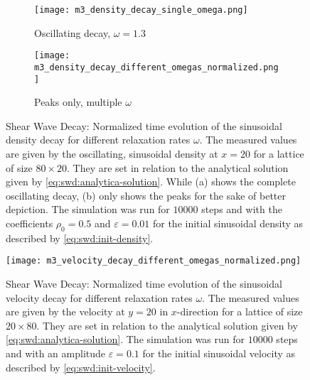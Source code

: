 \begin{figure}[ht!]
    \begin{subfigure}{\linewidth}
        \centering
        \texttt{[image: m3\_density\_decay\_single\_omega.png]}
        \caption{Oscillating decay, $\omega=1.3$}
        \label{fig:swd:density:single-omega}
    \end{subfigure}

    \begin{subfigure}{\linewidth}
        \texttt{[image: m3\_density\_decay\_different\_omegas\_normalized.png]}
        \caption{Peaks only, multiple $\omega$}
        \label{fig:swd:density:multiple-omega}
    \end{subfigure}

    \caption[Shear Wave Decay: Normalized time evolution of the sinusoidal density decay for different relaxation rates $\omega$]{Shear Wave Decay: Normalized time evolution of the sinusoidal density decay for different relaxation rates $\omega$. The measured values are given by the oscillating, sinusoidal density at $x=20$ for a lattice of size $80\times20$. They are set in relation to the analytical solution given by \cref{eq:swd:analytica-solution}. While (a) shows the complete oscillating decay, (b) only shows the peaks for the sake of better depiction. The simulation was run for $10000$ steps and with the coefficients $\rho_0=0.5$ and $\varepsilon=0.01$ for the initial sinusoidal density as described by \cref{eq:swd:init-density}.}
    \label{fig:swd:density:decay}
\end{figure}

\begin{figure}[ht!]
    \texttt{[image: m3\_velocity\_decay\_different\_omegas\_normalized.png]}
    \caption[Shear Wave Decay: Normalized time evolution of the sinusoidal velocity decay for different relaxation rates $\omega$]{Shear Wave Decay: Normalized time evolution of the sinusoidal velocity decay for different relaxation rates $\omega$. The measured values are given by the velocity at $y=20$ in $x$-direction for a lattice of size $20\times80$. They are set in relation to the analytical solution given by \cref{eq:swd:analytica-solution}. The simulation was run for $10000$ steps and with an amplitude $\varepsilon=0.1$ for the initial sinusoidal velocity as described by \cref{eq:swd:init-velocity}.}
    \label{fig:swd:velocity:multiple-omega}
\end{figure}

